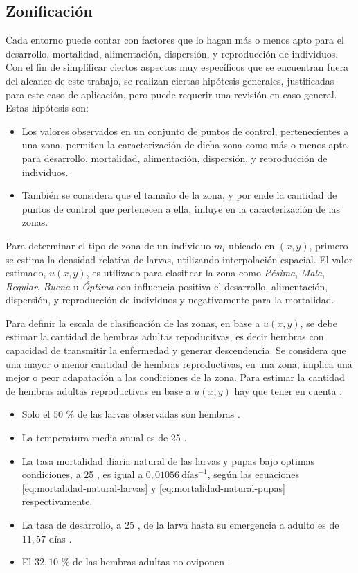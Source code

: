 \subsection{Zonificación}
\label{subsec:cap4-zonificacion}
Cada entorno puede contar con factores que lo hagan más o menos apto para el desarrollo,
mortalidad, alimentación, dispersión, y reproducción de individuos. Con el fin de
simplificar ciertos aspectos muy específicos que se encuentran fuera del alcance de este trabajo,
se realizan ciertas hipótesis generales, justificadas para este caso de aplicación, pero puede
requerir una revisión en caso general. Estas hipótesis son:
\begin{itemize}
    \item Los valores observados en un conjunto de puntos de control, pertenecientes a una zona, permiten la caracterización de dicha zona como más o menos apta para desarrollo, mortalidad, alimentación, dispersión, y reproducción de individuos.

    \item También se considera que el tamaño de la zona, y por ende la cantidad de puntos de control que pertenecen a ella, influye en la caracterización de las zonas.
\end{itemize}

Para determinar el tipo de zona de un individuo $m_{i}$ ubicado en $(x,y)$, primero se estima la
densidad relativa de larvas, utilizando interpolación espacial. El valor estimado,  $u(x,y)$, es
utilizado para clasificar la zona como \textit{Pésima}, \textit{Mala}, \textit{Regular},
\textit{Buena} u \textit{Óptima} con influencia positiva el desarrollo, alimentación, dispersión,
y reproducción de individuos y negativamente para la mortalidad.

Para definir la escala de clasificación de las zonas, en base a $u(x, y)$, se debe estimar la
cantidad de hembras adultas repoducitvas, es decir hembras con capacidad de transmitir la
enfermedad y generar descendencia. Se considera que una mayor o menor cantidad de hembras
reproductivas, en una zona, implica una mejor o peor adapatación a las condiciones de la zona. Para estimar la cantidad de hembras adultas reproductivas en base a $u(x, y)$ hay que tener en cuenta :

\begin{itemize}
    \item Solo el $50$ \% de las larvas observadas son hembras \cite{otero2006stochastic, manrique1998desarrollo}.
    \item La temperatura media anual es de 25 \textcelsius \cite{website:mspbsHistoria2014}.
    \item La tasa mortalidad diaria natural de las larvas y pupas bajo optimas condiciones, a 25 \textcelsius, es igual a $0,01056\ \text{días}^{-1}$, según las ecuaciones \eqref{eq:mortalidad-natural-larvas} y \eqref{eq:mortalidad-natural-pupas} respectivamente.
    \item La tasa de desarrollo, a 25 \textcelsius, de la larva hasta su emergencia a adulto es de $11,57$ días \cite{rueda1990temperature}.
    \item El $32,10$ \% de las hembras adultas no oviponen \cite{osoriopontificia}.
\end{itemize}

